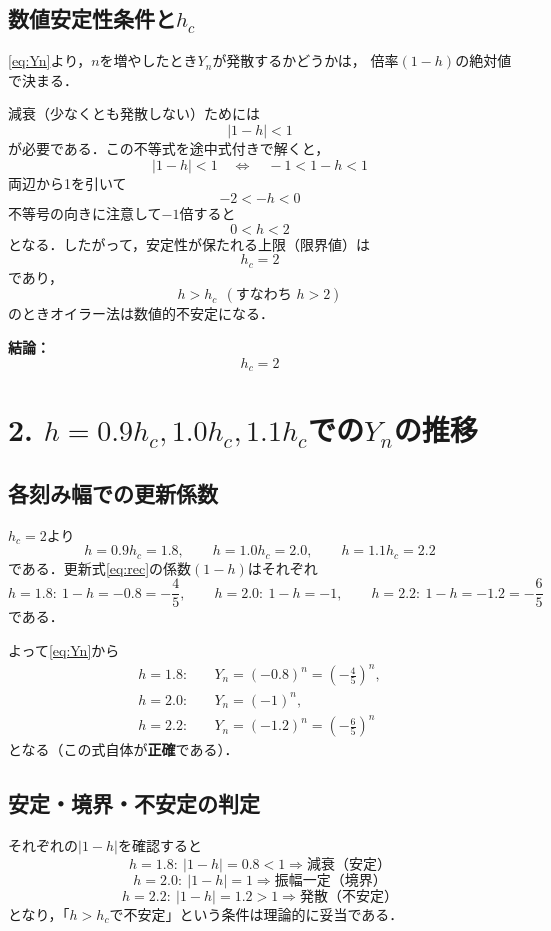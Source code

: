 \documentclass[a4paper,11pt]{jsarticle}
\begin{document}
\subsection{数値安定性条件と$h_c$}
\eqref{eq:Yn}より，$n$を増やしたとき$Y_n$が発散するかどうかは，
倍率$(1-h)$の絶対値で決まる．

減衰（少なくとも発散しない）ためには
\begin{equation}
|1-h|<1
\label{eq:stab}
\end{equation}
が必要である．この不等式を途中式付きで解くと，
\[
|1-h|<1
\quad\Longleftrightarrow\quad
-1 < 1-h < 1
\]
両辺から1を引いて
\[
-2 < -h < 0
\]
不等号の向きに注意して$-1$倍すると
\[
0 < h < 2
\]
となる．したがって，安定性が保たれる上限（限界値）は
\[
h_c=2
\]
であり，
\[
h>h_c \ \ (\text{すなわち } h>2)
\]
のときオイラー法は数値的不安定になる．

\medskip
\noindent
\textbf{結論：}
\begin{equation}
\boxed{\,h_c=2\,}
\end{equation}

\section{2. $h=0.9h_c,1.0h_c,1.1h_c$での$Y_n$の推移}

\subsection{各刻み幅での更新係数}
$h_c=2$より
\[
h=0.9h_c=1.8,\qquad
h=1.0h_c=2.0,\qquad
h=1.1h_c=2.2
\]
である．更新式\eqref{eq:rec}の係数$(1-h)$はそれぞれ
\[
h=1.8:\ 1-h = -0.8 = -\frac45,
\qquad
h=2.0:\ 1-h = -1,
\qquad
h=2.2:\ 1-h = -1.2 = -\frac65
\]
である．

よって\eqref{eq:Yn}から
\begin{align}
h=1.8:\quad &Y_n = ( -0.8 )^n = \left(-\frac45\right)^n,\\
h=2.0:\quad &Y_n = ( -1 )^n,\\
h=2.2:\quad &Y_n = ( -1.2 )^n = \left(-\frac65\right)^n
\end{align}
となる（この式自体が\textbf{正確}である）．

\subsection{安定・境界・不安定の判定}
それぞれの$|1-h|$を確認すると
\[
h=1.8:\ |1-h|=0.8<1 \Rightarrow \text{減衰（安定）}
\]
\[
h=2.0:\ |1-h|=1 \Rightarrow \text{振幅一定（境界）}
\]
\[
h=2.2:\ |1-h|=1.2>1 \Rightarrow \text{発散（不安定）}
\]
となり，「$h>h_c$で不安定」という条件は理論的に妥当である．
\end{document}
